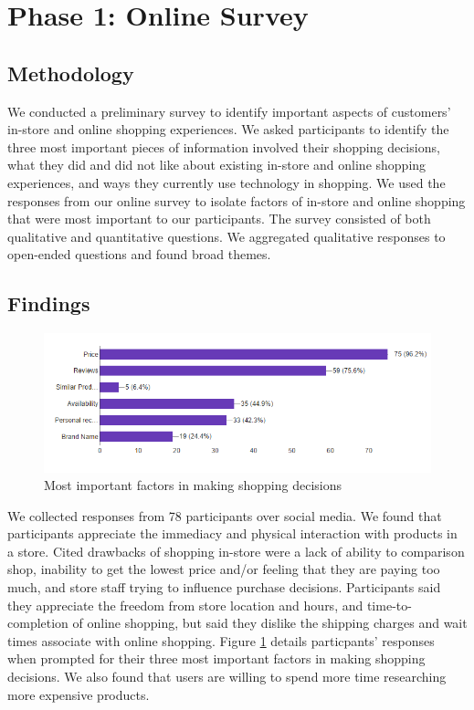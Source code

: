 \section{Phase 1: Online Survey}
\subsection{Methodology}
We conducted a preliminary survey to identify important aspects of customers' in-store and online shopping experiences. We asked participants to identify the three most important pieces of information involved their shopping decisions, what they did and did not like about existing in-store and online shopping experiences, and ways they currently use technology in shopping.   
We used the responses from our online survey to isolate factors of in-store and online shopping that were most important to our participants.  The survey consisted of both qualitative and quantitative questions.  We aggregated qualitative responses to open-ended questions and found broad themes.     


\subsection{Findings}
\begin{figure}
	\includegraphics[width=0.9\columnwidth]{figures/ShoppingFactors}
	\caption{Most important factors in making shopping decisions}
	\label{figures:ShoppingFactors}
\end{figure}

We collected responses from 78 participants over social media.  We found that participants appreciate the immediacy and physical interaction with products in a store.  Cited drawbacks of shopping in-store were a lack of ability to comparison shop, inability to get the lowest price and/or feeling that they are paying too much, and store staff trying to influence purchase decisions.  Participants said they appreciate the freedom from store location and hours, and time-to-completion of online shopping, but said they dislike the shipping charges and wait times associate with online shopping.  Figure \ref{figures:ShoppingFactors} details particpants' responses when prompted for their three most important factors in making shopping decisions.  We also found that users are willing to spend more time researching more expensive products.
